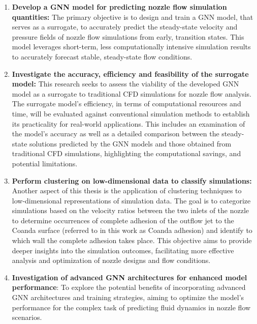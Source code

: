 \begin{enumerate}
\item \textbf{Develop a GNN model for predicting nozzle flow simulation quantities:} 
The primary objective is to design and train a GNN model, that serves as a surrogate, to accurately predict the steady-state velocity and pressure fields of nozzle flow simulations from early, transition states. This model leverages short-term, less computationally intensive simulation results to accurately forecast stable, steady-state flow conditions.
\item \textbf{Investigate the accuracy, efficiency and feasibility of the surrogate model:} This research seeks to assess the viability of the developed GNN model as a surrogate to traditional CFD simulations for nozzle flow analysis. The surrogate model's efficiency, in terms of computational resources and time, will be evaluated against conventional simulation methods to establish its practicality for real-world applications.
This includes an examination of the model's accuracy as well as a detailed comparison between the steady-state solutions predicted by the GNN models and those obtained from traditional CFD simulations, highlighting the computational savings, and potential limitations.
\item \textbf{Perform clustering on low-dimensional data to classify simulations:} Another aspect of this thesis is the application of clustering techniques to low-dimensional representations of simulation data. The goal is to categorize simulations based on the velocity ratios between the two inlets of the nozzle to determine occurrences of complete adhesion of the outflow jet to the Coanda surface (referred to in this work as Coanda adhesion) and identify to which wall the complete adhesion takes place. This objective aims to provide deeper insights into the simulation outcomes, facilitating more effective analysis and optimization of nozzle designs and flow conditions.
\item \textbf{Investigation of advanced GNN architectures for enhanced model performance}: To explore the potential benefits of incorporating advanced GNN architectures and training strategies, aiming to optimize the model's performance for the complex task of predicting fluid dynamics in nozzle flow scenarios.
\end{enumerate}
